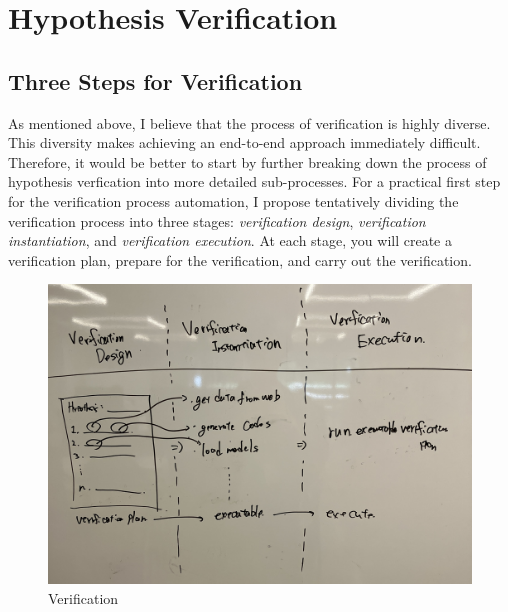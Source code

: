 \documentclass{article}
\begin{document}


\section{Hypothesis Verification}

\subsection{Three Steps for Verification}

As mentioned above, I believe that the process of verification is highly diverse. This diversity makes achieving an end-to-end approach immediately difficult. Therefore, it would be better to start by further breaking down the process of hypothesis verfication into more detailed sub-processes. For a practical first step for the verification process automation, I propose tentatively dividing the verification process into three stages: \textit{verification design}, \textit{verification instantiation}, and \textit{verification execution}. At each stage, you will create a verification plan, prepare for the verification, and carry out the verification.

\begin{figure}[htb]
    \centering
    \includegraphics[width=\textwidth]{figs/verification.jpg}
    \caption{Verification}
    \label{fig:verification}
\end{figure}
\end{document}
